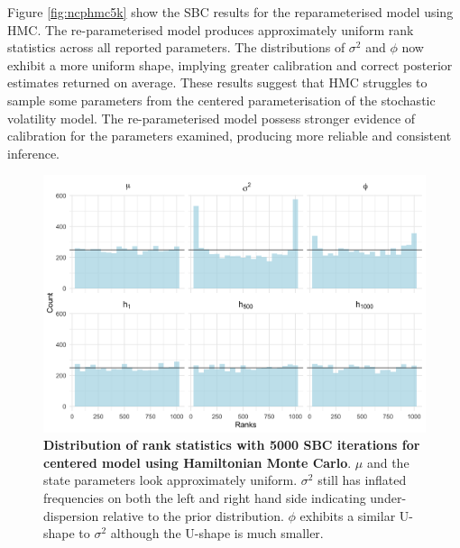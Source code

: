\documentclass[12pt, a4paper]{article}
\begin{document}
    Figure \ref{fig:ncphmc5k} show the SBC results for the reparameterised model using HMC. The re-parameterised model produces approximately uniform rank statistics across all reported parameters. The distributions of $\sigma^2$ and $\phi$ now exhibit a more uniform shape, implying greater calibration and correct posterior estimates returned on average. These results suggest that HMC struggles to sample some parameters from the centered parameterisation of the stochastic volatility model. The re-parameterised model possess stronger evidence of calibration for the parameters examined, producing more reliable and consistent inference.
        \begin{figure}[H]
        \centering
        \includegraphics[scale=0.09]{results/hmc_cp_5k.png}
        \caption{\textbf{Distribution of rank statistics with 5000 SBC iterations for centered model using Hamiltonian Monte Carlo}. $\mu$ and the state parameters look approximately uniform. $\sigma^2$ still has inflated frequencies on both the left and right hand side indicating under-dispersion relative to the prior distribution. $\phi$ exhibits a similar U-shape to $\sigma^2$ although the U-shape is much smaller.}
        \label{fig:cphmc5k}
    \end{figure}
\end{document}
